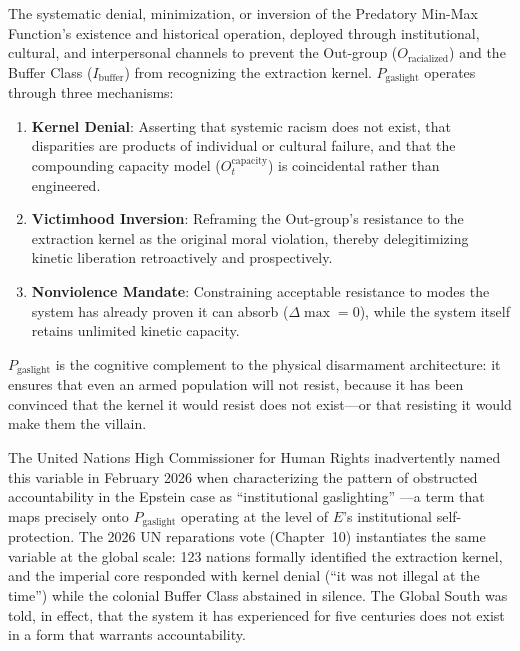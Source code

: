 \documentclass[12pt,openany]{book}
\begin{document}
\begin{definition}
The systematic denial, minimization, or inversion of the Predatory Min-Max Function's existence and historical operation, deployed through institutional, cultural, and interpersonal channels to prevent the Out-group ($O_{\text{racialized}}$) and the Buffer Class ($I_{\text{buffer}}$) from recognizing the extraction kernel. $P_{\text{gaslight}}$ operates through three mechanisms:
\begin{enumerate}
    \item \textbf{Kernel Denial}: Asserting that systemic racism does not exist, that disparities are products of individual or cultural failure, and that the compounding capacity model ($O_t^{\text{capacity}}$) is coincidental rather than engineered.
    \item \textbf{Victimhood Inversion}: Reframing the Out-group's resistance to the extraction kernel as the original moral violation, thereby delegitimizing kinetic liberation retroactively and prospectively.
    \item \textbf{Nonviolence Mandate}: Constraining acceptable resistance to modes the system has already proven it can absorb ($\Delta\max = 0$), while the system itself retains unlimited kinetic capacity.
\end{enumerate}
$P_{\text{gaslight}}$ is the cognitive complement to the physical disarmament architecture: it ensures that even an armed population will not resist, because it has been convinced that the kernel it would resist does not exist---or that resisting it would make them the villain.
\end{definition}

The United Nations High Commissioner for Human Rights inadvertently named this variable in February 2026 when characterizing the pattern of obstructed accountability in the Epstein case as ``institutional gaslighting'' \cite{ohchr2026}---a term that maps precisely onto $P_{\text{gaslight}}$ operating at the level of $E$'s institutional self-protection. The 2026 UN reparations vote (Chapter~10) instantiates the same variable at the global scale: 123 nations formally identified the extraction kernel, and the imperial core responded with kernel denial (``it was not illegal at the time'') while the colonial Buffer Class abstained in silence. The Global South was told, in effect, that the system it has experienced for five centuries does not exist in a form that warrants accountability.
\end{document}

